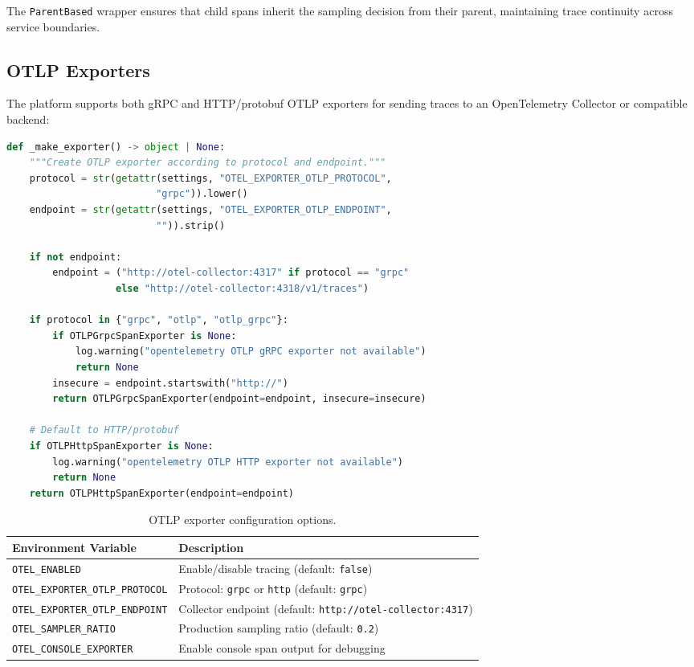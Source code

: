 The \texttt{ParentBased} wrapper ensures that child spans inherit the sampling decision from their parent, maintaining trace continuity across service boundaries.

\subsection{OTLP Exporters}

The platform supports both gRPC and HTTP/protobuf OTLP exporters for sending traces to an OpenTelemetry Collector or compatible backend:

\begin{lstlisting}[language=Python, caption={OTLP exporter configuration}]
def _make_exporter() -> object | None:
    """Create OTLP exporter according to protocol and endpoint."""
    protocol = str(getattr(settings, "OTEL_EXPORTER_OTLP_PROTOCOL", 
                          "grpc")).lower()
    endpoint = str(getattr(settings, "OTEL_EXPORTER_OTLP_ENDPOINT", 
                          "")).strip()
    
    if not endpoint:
        endpoint = ("http://otel-collector:4317" if protocol == "grpc" 
                   else "http://otel-collector:4318/v1/traces")
    
    if protocol in {"grpc", "otlp", "otlp_grpc"}:
        if OTLPGrpcSpanExporter is None:
            log.warning("opentelemetry OTLP gRPC exporter not available")
            return None
        insecure = endpoint.startswith("http://")
        return OTLPGrpcSpanExporter(endpoint=endpoint, insecure=insecure)
    
    # Default to HTTP/protobuf
    if OTLPHttpSpanExporter is None:
        log.warning("opentelemetry OTLP HTTP exporter not available")
        return None
    return OTLPHttpSpanExporter(endpoint=endpoint)
\end{lstlisting}

\begin{table}[ht]
\centering
\caption{OTLP exporter configuration options.}
\label{tab:otlp-config}
\begin{tabular}{lp{8cm}}
\hline
\textbf{Environment Variable} & \textbf{Description} \\
\hline
\texttt{OTEL\_ENABLED} & Enable/disable tracing (default: \texttt{false}) \\
\texttt{OTEL\_EXPORTER\_OTLP\_PROTOCOL} & Protocol: \texttt{grpc} or \texttt{http} (default: \texttt{grpc}) \\
\texttt{OTEL\_EXPORTER\_OTLP\_ENDPOINT} & Collector endpoint (default: \texttt{http://otel-collector:4317}) \\
\texttt{OTEL\_SAMPLER\_RATIO} & Production sampling ratio (default: \texttt{0.2}) \\
\texttt{OTEL\_CONSOLE\_EXPORTER} & Enable console span output for debugging \\
\hline
\end{tabular}
\end{table}

